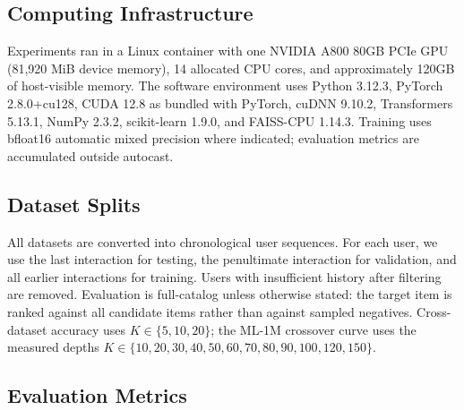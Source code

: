 \documentclass[letterpaper]{article}
\begin{document}
\subsection{Computing Infrastructure}
\label{app:infrastructure}

Experiments ran in a Linux container with one NVIDIA A800 80GB PCIe GPU
(81,920 MiB device memory), 14 allocated CPU cores, and approximately 120GB
of host-visible memory. The software environment uses Python 3.12.3,
PyTorch 2.8.0+cu128, CUDA 12.8 as bundled with PyTorch, cuDNN 9.10.2,
Transformers 5.13.1, NumPy 2.3.2, scikit-learn 1.9.0, and FAISS-CPU 1.14.3.
Training uses bfloat16 automatic mixed precision where indicated; evaluation
metrics are accumulated outside autocast.

\subsection{Dataset Splits}
\label{app:splits}

All datasets are converted into chronological user sequences. For each user,
we use the last interaction for testing, the penultimate interaction for
validation, and all earlier interactions for training. Users with insufficient
history after filtering are removed. Evaluation is full-catalog unless
otherwise stated: the target item is ranked against all candidate items rather
than against sampled negatives. Cross-dataset accuracy uses
\(K\in\{5,10,20\}\); the ML-1M crossover curve uses the measured depths
\(K\in\{10,20,30,40,50,60,70,80,90,100,120,150\}\).

\subsection{Evaluation Metrics}
\label{app:metrics}
\end{document}
